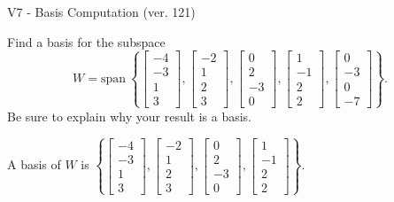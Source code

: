 \begin{exercise}
  \begin{exerciseTitle}V7 - Basis Computation (ver. 121)\end{exerciseTitle}
  \begin{exerciseStatement}
    Find a basis for the subspace 
\[W=\mathrm{span}\ \left\{\left[\begin{array}{r}
-4 \\
-3 \\
1 \\
3
\end{array}\right] , \left[\begin{array}{r}
-2 \\
1 \\
2 \\
3
\end{array}\right] , \left[\begin{array}{r}
0 \\
2 \\
-3 \\
0
\end{array}\right] , \left[\begin{array}{r}
1 \\
-1 \\
2 \\
2
\end{array}\right] , \left[\begin{array}{r}
0 \\
-3 \\
0 \\
-7
\end{array}\right]\right\}.\]
 Be sure to explain why your result is a basis.


  \end{exerciseStatement}
  \begin{exerciseAnswer}
   A basis of \(W\) is  \(\left\{\left[\begin{array}{r}
-4 \\
-3 \\
1 \\
3
\end{array}\right] , \left[\begin{array}{r}
-2 \\
1 \\
2 \\
3
\end{array}\right] , \left[\begin{array}{r}
0 \\
2 \\
-3 \\
0
\end{array}\right] , \left[\begin{array}{r}
1 \\
-1 \\
2 \\
2
\end{array}\right]\right\}\).
  


  \end{exerciseAnswer}
\end{exercise}